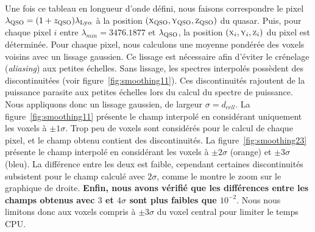 \documentclass[11pt, twoside, a4paper, openright]{report}
\begin{document}
Une fois ce tableau en longueur d'onde défini, nous faisons correspondre le pixel $\lambda_{\textsc{QSO}} = (1+z_{\textsc{QSO}}) \lambda_{\mathrm{Ly}\alpha}$ à la position $(\textsc{x}_{\textsc{QSO}}, \textsc{y}_{\textsc{QSO}}, \textsc{z}_{\textsc{QSO}})$ du quasar.
Puis, pour chaque pixel $i$ entre $\lambda_{min} = \num{3476.1877}$ et $\lambda_{\textsc{QSO}}$, la position $(\textsc{x}_i, \textsc{y}_i, \textsc{z}_i)$ du pixel est déterminée.
Pour chaque pixel, nous calculons une moyenne pondérée des voxels voisins avec un lissage gaussien.
  Ce lissage est nécessaire afin d'éviter le crénelage (\emph{aliasing}) aux petites échelles.
  Sans lissage, les spectres interpolés possèdent des discontinuitées (voir figure~\ref{fig:smoothing11}). Ces discontinuités rajoutent de la puissance parasite aux petites échelles lors du calcul du spectre de puissance.
  Nous appliquons donc un lissage gaussien, de largeur $\sigma = d_{cell}$.
La figure~\ref{fig:smoothing11} présente le champ interpolé en considérant uniquement les voxels à $\pm 1 \sigma$. Trop peu de voxels sont considérés pour le calcul de chaque pixel, et le champ obtenu contient des discontinuités. La figure~\ref{fig:smoothing23} présente le champ interpolé en considérant les voxels à $\pm 2 \sigma$ (orange) et $\pm 3 \sigma$ (bleu). La différence entre les deux est faible, cependant certaines discontinuités subsistent pour le champ calculé avec $2 \sigma$, comme le montre le zoom sur le graphique de droite. \textbf{Enfin, nous avons vérifié que les différences entre les champs obtenus avec $3$ et $4 \sigma$ sont plus faibles que $10^{-2}$}. Nous nous limitons donc aux voxels compris à $\pm 3 \sigma$ du voxel central pour limiter le temps CPU.
\end{document}
